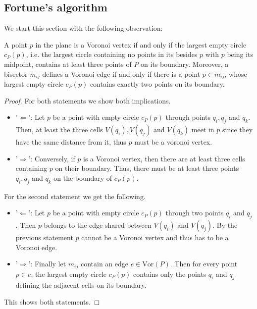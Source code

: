     \subsection{Fortune's algorithm}
        We start this section with the following observation:
        \begin{proposition}
            A point $p$ in the plane is a Voronoi vertex if and only if the largest empty circle $c_P(p)$, i.e. the largest circle containing no points in its  besides $p$ with $p$ being its midpoint, contains at least three points of $P$ on its boundary. Moreover, a bisector $m_{ij}$ defines a Voronoi edge if and only if there is a point $p \in m_{ij}$, whose largest empty circle $c_P(p)$ contains exactly two points on its boundary. 
        \end{proposition}
        \begin{proof}
            For both statements we show both implications. 
            \begin{itemize}
                \item[] '$\Leftarrow$': Let $p$ be a point with empty circle $c_P(p)$ through points $q_i, q_j$ and $q_k$. Then, at least the three cells $V(q_i), V(q_j)$ and $V(q_k)$ meet in $p$ since they have the same distance from it, thus $p$ must be a voronoi vertex. 
                
                \item[] '$\Rightarrow$': Conversely, if $p$ is a Voronoi vertex, then there are at least three cells containing $p$ on their boundary. Thus, there must be at least three points $q_i, q_j$ and $q_k$ on the boundary of $c_P(p)$.
            \end{itemize}
            For the second statement we get the following.
            \begin{itemize}
                \item[] '$\Leftarrow$': Let $p$ be a point with empty circle $c_P(p)$ through two points $q_i$ and $q_j$. Then $p$ belongs to the edge shared between $V(q_i)$ and $V(q_j)$. By the previous statement $p$ cannot be a Voronoi vertex and thus has to be a Voronoi edge.
                \item[] '$\Rightarrow$': Finally let $m_{ij}$ contain an edge $e \in \text{Vor}(P)$. Then for every point $p \in e$, the largest empty circle $c_P(p)$ contains only the points $q_i$ and $q_j$ defining the adjacent cells on its boundary.
            \end{itemize}
            This shows both statements.
        \end{proof}
        

